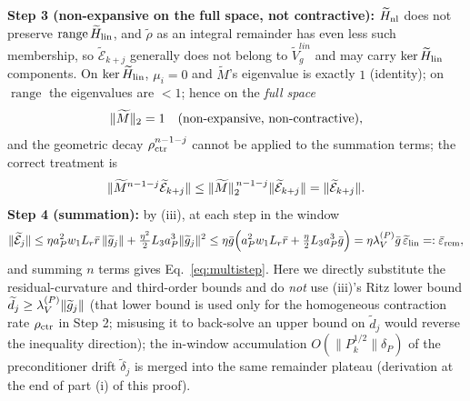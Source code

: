 \documentclass[11pt]{article}
\DeclarePairedDelimiter{\norm}{\lVert}{\rVert}
\newcommand{\Erem}{\mathcal E}
\newcommand{\wt}[1]{\widetilde{#1}}
\numberwithin{equation}{section}
\begin{document}
\noindent\textbf{Step 3 (non-expansive on the full space, not contractive):} $\wt H_{\rm nl}$ does not preserve $\operatorname{range}\wt H_{\rm lin}$, and $\wt\rho$ as an integral remainder has even less such membership, so $\wt\Erem_{k+j}$ generally does not belong to $\wt V_g^{lin}$ and may carry $\ker\wt H_{\rm lin}$ components. On $\ker\wt H_{\rm lin}$, $\mu_i=0$ and $\wt M$'s eigenvalue is exactly $1$ (identity); on $\operatorname{range}$ the eigenvalues are $<1$; hence on the \emph{full space}
\begin{equation}
\norm{\wt M}_2=1\quad\text{(non-expansive, non-contractive)},
\end{equation}
and the geometric decay $\rho_{\rm ctr}^{n-1-j}$ cannot be applied to the summation terms; the correct treatment is
\begin{equation}
\norm{\wt M^{n-1-j}\wt\Erem_{k+j}}\le\norm{\wt M}_2^{\,n-1-j}\norm{\wt\Erem_{k+j}}
=\norm{\wt\Erem_{k+j}}.
\end{equation}
\textbf{Step 4 (summation):} by (iii), at each step in the window
\begin{equation}
\norm{\wt\Erem_j}
\le\eta a_P^2w_1L_r\bar r\,\norm{\wt g_j}
  +\tfrac{\eta^2}{2}L_3a_P^3\norm{\wt g_j}^2
\le\eta\bar g\Big(a_P^2w_1L_r\bar r+\tfrac{\eta}{2}L_3a_P^3\bar g\Big)
=\eta\lambda_V^{(P)}\bar g\,\wt\varepsilon_{\rm lin}
=:\bar\varepsilon_{\rm rem},
\end{equation}
and summing $n$ terms gives Eq.~\eqref{eq:multistep}. Here we directly substitute the residual-curvature and third-order bounds and do \emph{not} use (iii)'s Ritz lower bound $\wt d_j\ge\lambda_V^{(P)}\norm{\wt g_j}$ (that lower bound is used only for the homogeneous contraction rate $\rho_{\rm ctr}$ in Step 2; misusing it to back-solve an upper bound on $\wt d_j$ would reverse the inequality direction); the in-window accumulation $O(\|P_k^{1/2}\|\delta_P)$ of the preconditioner drift $\wt\delta_j$ is merged into the same remainder plateau (derivation at the end of part (i) of this proof).
\end{document}
